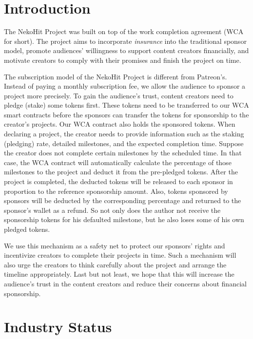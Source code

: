 \documentclass[12pt,a4paper]{article}
\begin{document}
    \section{Introduction}\label{sec:intro}

    The NekoHit Project was built on top of the work completion agreement (WCA
    for short).
    The project aims to incorporate \textit{insurance} into the traditional sponsor
    model, promote audiences' willingness to support content creators financially,
    and motivate creators to comply with their promises and finish the project
    on time.

    The subscription model of the NekoHit Project is different from Patreon's.
    Instead of paying a monthly subscription fee, we allow the audience to sponsor
    a project more precisely.
    To gain the audience's trust, content creators need to pledge (stake) some
    tokens first.
    These tokens need to be transferred to our WCA smart contracts before the
    sponsors can transfer the tokens for sponsorship to the creator's projects.
    Our WCA contract also holds the sponsored tokens.
    When declaring a project, the creator needs to provide information such as
    the staking (pledging) rate, detailed milestones, and the expected completion
    time.
    Suppose the creator does not complete certain milestones by the scheduled time.
    In that case, the WCA contract will automatically calculate the percentage of
    those milestones to the project and deduct it from the pre-pledged tokens.
    After the project is completed, the deducted tokens will be released to each
    sponsor in proportion to the reference sponsorship amount.
    Also, tokens sponsored by sponsors will be deducted by the corresponding
    percentage and returned to the sponsor's wallet as a refund.
    So not only does the author not receive the sponsorship tokens for his defaulted
    milestone, but he also loses some of his own pledged tokens.

    We use this mechanism as a safety net to protect our sponsors' rights and
    incentivize creators to complete their projects in time.
    Such a mechanism will also urge the creators to think carefully about the
    project and arrange the timeline appropriately.
    Last but not least, we hope that this will increase the audience's trust in
    the content creators and reduce their concerns about financial sponsorship.


    \section{Industry Status}\label{sec:now}
\end{document}
